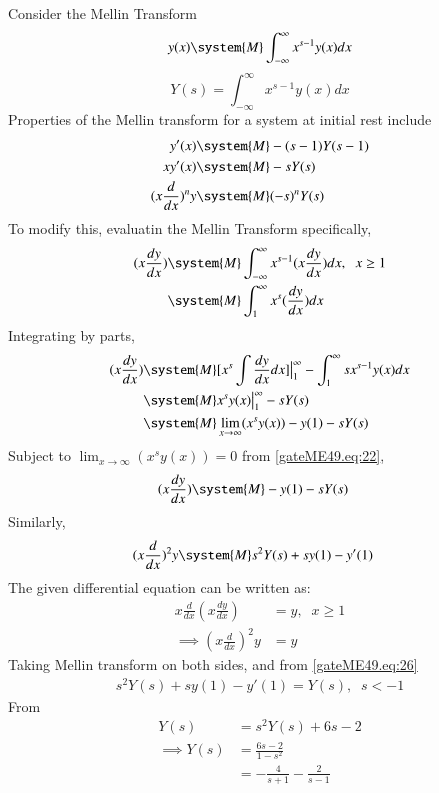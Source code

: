 \documentclass[journal,12pt,twocolumn]{IEEEtran}
\theoremstyle{remark}
\begin{document}
Consider the Mellin Transform
\begin{align}
    y(x)\system{M}\int_{-\infty}^{\infty} x^{s-1}y(x){dx} 
\end{align}
 $$Y(s)=\int_{-\infty}^{\infty} x^{s-1}y(x){dx} $$ 
 Properties of the Mellin transform for a system at initial rest include 
\begin{align}
    y'(x) &\system{M} -(s-1)Y(s-1)\\
    xy'(x) &\system{M} -s Y(s)\\
    (x\frac{d}{dx})^ny&\system{M} (-s)^nY(s) 
\end{align}
To modify this, evaluatin the Mellin Transform specifically,
\begin{align}
    (x\frac{dy}{dx}) &\system{M} \int_{-\infty}^{\infty} x^{s-1}(x\frac{dy}{dx}){dx}, \;\;x\geq1\\ 
    &\system{M} \int_{1}^{\infty} x^{s}(\frac{dy}{dx}){dx}
\end{align} 
Integrating by parts, 
\begin{align}
    (x\frac{dy}{dx}) &\system{M} [x^s\int \frac{dy}{dx}dx ]\big{|}_1 ^{\infty}-\int_1^{\infty} sx^{s-1}y(x)dx\\
    &\system{M} x^sy(x)\big{|}_1^{\infty} -sY(s)\\
    &\system{M} \lim_{x\rightarrow{\infty}} (x^s y(x))-y(1)-sY(s)
\end{align} 
Subject to $\lim_{x\rightarrow{\infty}} (x^s y(x))=0$ from \eqref{gateME49.eq:22}, 
\begin{align}
    (x\frac{dy}{dx}) &\system{M} -y(1)-sY(s)
\end{align}
Similarly, 
\begin{align}
    (x\frac{d}{dx})^2 y &\system {M} s^2Y(s)+sy(1)-y'(1)
\end{align}
The given differential equation can be written as: 
\begin{align}
    x\frac{d}{dx}(x\frac{dy}{dx})&=y,\;\;x\geq 1\\
    \implies (x\frac{d}{dx})^2y&=y
\end{align}
Taking Mellin transform on both sides, and from \eqref{gateME49.eq:26} 
\begin{align}
    s^2Y(s)+sy(1)-y'(1)=Y(s),\;\;s<-1
\end{align}
From 
\begin{align}
    Y(s)&=s^2Y(s)+6s-2\\
    \implies Y(s)&= \frac{6s-2}{1-s^2}\\&=-\frac{4}{s+1}-\frac{2}{s-1}
\end{align}
\end{document}
